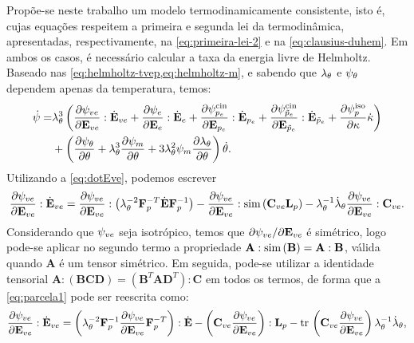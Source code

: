 \documentclass[Tese.tex]{subfiles}
\begin{document}
Propõe-se neste trabalho um modelo termodinamicamente consistente, isto é, cujas equações respeitem a primeira e segunda lei da termodinâmica, apresentadas, respectivamente, na \cref{eq:primeira-lei-2} e na \cref{eq:clausius-duhem}. Em ambos os casos, é necessário calcular a taxa da energia livre de Helmholtz. Baseado nas \cref{eq:helmholtz-tvep,eq:helmholtz-m}, e sabendo que $\lambda_{\theta}$ e $\psi_{\theta}$ dependem apenas da temperatura, temos:
\begin{equation}
\begin{aligned}\label{eq:dotHelmholtz-tvep}
\dot{\psi} = &\lambda_{\theta}^3\left(\dfrac{\partial \psi_{ve}}{\partial \mathbf{E}_{ve}}:\dot{\mathbf{E}}_{ve} + \dfrac{\partial \psi_e}{\partial \mathbf{E}_e}:\dot{\mathbf{E}}_e + \dfrac{\partial \psi_{p_e}^\text{cin}}{\partial \mathbf{E}_{p_e}}:\dot{\mathbf{E}}_{p_e} + \dfrac{\partial \psi_{\tilde{p}_e}^\text{cin}}{\partial \mathbf{E}_{\tilde{p}_e}}:\dot{\mathbf{E}}_{\tilde{p}_e} + \dfrac{\partial \psi_p^\text{iso}}{\partial \kappa}\dot{\kappa}\right) \\ & + \left(\dfrac{\partial \psi_{\theta}}{\partial \theta} + \lambda_{\theta}^3\dfrac{\partial\psi_m}{\partial\theta} + 3\lambda_{\theta}^2\psi_m\dfrac{\partial \lambda_{\theta}}{\partial \theta}\right)\dot{\theta} .
\end{aligned}
\end{equation}
Utilizando a \cref{eq:dotEve}, podemos escrever
\begin{equation}\label{eq:parcela1}
\dfrac{\partial \psi_{ve}}{\partial \mathbf{E}_{ve}}:\dot{\mathbf{E}}_{ve} = \dfrac{\partial \psi_{ve}}{\partial \mathbf{E}_{ve}}:\left(\lambda_{\theta}^{-2}\mathbf{F}_p^{-T}\dot{\mathbf{E}}\mathbf{F}_p^{-1}\right) - \dfrac{\partial \psi_{ve}}{\partial \mathbf{E}_{ve}}:\text{sim}\,(\mathbf{C}_{ve}\mathbf{L}_p) - \lambda_{\theta}^{-1}\dot{\lambda}_{\theta}\dfrac{\partial \psi_{ve}}{\partial \mathbf{E}_{ve}}:\mathbf{C}_{ve}.
\end{equation} 
Considerando que $\psi_{ve}$ seja isotrópico, temos que $\partial \psi_{ve}/\partial \mathbf{E}_{ve}$ é simétrico, logo pode-se aplicar no segundo termo a propriedade $\mathbf{A}:\text{sim}\,(\mathbf{B})=\mathbf{A}:\mathbf{B}$, válida quando $\mathbf{A}$ é um tensor simétrico. Em seguida, pode-se utilizar a identidade tensorial $\mathbf{A}:(\mathbf{B}\mathbf{C}\mathbf{D}) = (\mathbf{B}^T\mathbf{A}\mathbf{D}^T):\mathbf{C}$ em todos os termos, de forma que a \cref{eq:parcela1} pode ser reescrita como:
\begin{equation}\label{eq:parcela1-1}
\dfrac{\partial \psi_{ve}}{\partial \mathbf{E}_{ve}}:\dot{\mathbf{E}}_{ve} = \left(\lambda_{\theta}^{-2}\mathbf{F}_p^{-1}\dfrac{\partial \psi_{ve}}{\partial \mathbf{E}_{ve}}\mathbf{F}_p^{-T}\right):\dot{\mathbf{E}} - \left(\mathbf{C}_{ve}\dfrac{\partial \psi_{ve}}{\partial \mathbf{E}_{ve}}\right):\mathbf{L}_p - \text{tr}\,\left(\mathbf{C}_{ve}\dfrac{\partial \psi_{ve}}{\partial \mathbf{E}_{ve}}\right)\lambda_{\theta}^{-1}\dot{\lambda}_{\theta},
\end{equation}
\end{document}
